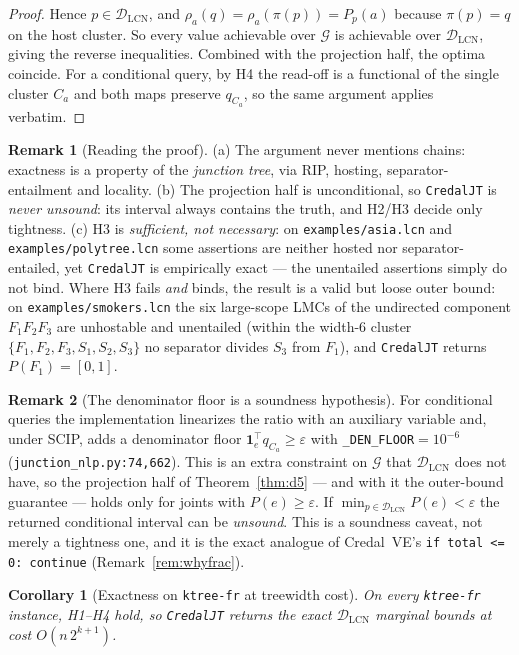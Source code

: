 \documentclass[11pt]{article}
\newtheorem{corollary}{Corollary}
\theoremstyle{definition}
\newtheorem{remark}{Remark}
\newcommand{\DLCN}{\mathcal{D}_{\mathrm{LCN}}}
\newcommand{\readoff}{\rho}
\begin{document}
\begin{proof}
Hence $p\in\DLCN$, and $\readoff_a(q)=\readoff_a(\pi(p))=P_p(a)$ because $\pi(p)=q$ on the host
cluster. So every value achievable over $\mathcal G$ is achievable over $\DLCN$, giving the reverse
inequalities. Combined with the projection half, the optima coincide. For a conditional query, by H4
the read-off is a functional of the single cluster $C_a$ and both maps preserve $q_{C_a}$, so the same
argument applies verbatim.
\end{proof}

\begin{remark}[Reading the proof]\label{rem:d5reading}
(a) The argument never mentions chains: exactness is a property of the \emph{junction tree}, via RIP,
hosting, separator-entailment and locality. (b) The projection half is unconditional, so
\texttt{CredalJT} is \emph{never unsound}: its interval always contains the truth, and H2/H3 decide
only tightness. (c) H3 is \emph{sufficient, not necessary}: on \texttt{examples/asia.lcn} and
\texttt{examples/polytree.lcn} some assertions are neither hosted nor separator-entailed, yet
\texttt{CredalJT} is empirically exact --- the unentailed assertions simply do not bind. Where H3
fails \emph{and} binds, the result is a valid but loose outer bound: on \texttt{examples/smokers.lcn}
the six large-scope LMCs of the undirected component $F_1F_2F_3$ are unhostable and unentailed
(within the width-$6$ cluster $\{F_1,F_2,F_3,S_1,S_2,S_3\}$ no separator divides $S_3$ from $F_1$),
and \texttt{CredalJT} returns $P(F_1)=[0,1]$.
\end{remark}

\begin{remark}[The denominator floor is a soundness hypothesis]\label{rem:denfloor}
For conditional queries the implementation linearizes the ratio with an auxiliary variable and, under
SCIP, adds a denominator floor $\mathbf 1_e^\top q_{C_a}\ge\varepsilon$ with
\texttt{\_DEN\_FLOOR}$=10^{-6}$ (\texttt{junction\_nlp.py:74,662}). This is an extra constraint on
$\mathcal G$ that $\DLCN$ does not have, so the projection half of Theorem~\ref{thm:d5} --- and with
it the outer-bound guarantee --- holds only for joints with $P(e)\ge\varepsilon$. If
$\min_{p\in\DLCN}P(e)<\varepsilon$ the returned conditional interval can be \emph{unsound}. This is a
soundness caveat, not merely a tightness one, and it is the exact analogue of Credal~VE's
\texttt{if total <= 0: continue} (Remark~\ref{rem:whyfrac}).
\end{remark}

\begin{corollary}[Exactness on \texttt{ktree-fr} at treewidth cost]\label{cor:ktree}
On every \texttt{ktree-fr} instance, H1--H4 hold, so \texttt{CredalJT} returns the exact $\DLCN$
marginal bounds at cost $O(n\,2^{k+1})$.
\end{corollary}
\end{document}
